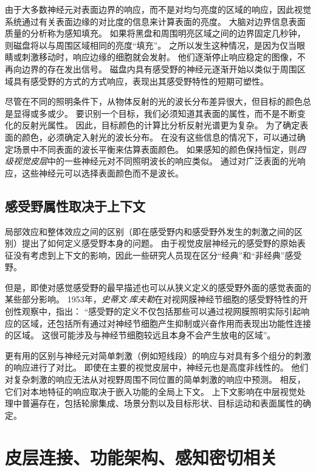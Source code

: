 由于大多数神经元对表面边界的响应，而不是对均匀亮度的区域的响应，因此视觉系统通过有关表面边缘的对比度的信息来计算表面的亮度。
大脑对边界信息表面质量的分析称为感知填充。
如果将黑盘和周围明亮区域之间的边界固定几秒钟，则磁盘将以与周围区域相同的亮度“填充”。
之所以发生这种情况，是因为仅当眼睛或刺激移动时，响应边缘的细胞就会发射。
他们逐渐停止响应稳定的图像，不再向边界的存在发出信号。
磁盘内具有感受野的神经元逐渐开始以类似于周围区域具有感受野的方式的方式响应，表现出其感受野特性的短期可塑性。


尽管在不同的照明条件下，从物体反射的光的波长分布差异很大，但目标的颜色总是显得或多或少。
要识别一个目标，我们必须知道其表面的属性，而不是不断变化的反射光属性。
因此，目标颜色的计算比分析反射光谱更为复杂。
为了确定表面的颜色，必须确定入射光的波长分布。
在没有这些信息的情况下，可以通过确定场景中不同表面的波长平衡来估算表面颜色。
如果感知的颜色保持恒定，则\textit{四级视觉皮层}中的一些神经元对不同照明波长的响应类似。
通过对广泛表面的光响应，这些神经元可以选择表面颜色而不是波长。



\subsection{感受野属性取决于上下文}

局部效应和整体效应之间的区别（即在感受野内和感受野外发生的刺激之间的区别）提出了如何定义感受野本身的问题。
由于视觉皮层神经元的感受野的原始表征没有考虑到上下文的影响，因此一些研究人员现在区分“经典”和“非经典”感受野。


但是，即使对感觉感受野的最早描述也可以从狭义定义的感受野外面的感觉表面的某些部分影响。
1953年，\textit{史蒂文$\cdot$库夫勒}在对视网膜神经节细胞的感受野特性的开创性观察中，指出：
“感受野的定义不仅包括那些可以通过视网膜照明实际引起响应的区域，还包括所有通过对神经节细胞产生抑制或兴奋作用而表现出功能性连接的区域。
这很可能涉及与神经节细胞较远且本身不会产生放电的区域”。


更有用的区别与神经元对简单刺激（例如短线段）的响应与对具有多个组分的刺激的响应进行了对比。
即使在主要的视觉皮层中，神经元也是高度非线性的。
他们对复杂刺激的响应无法从对视野周围不同位置的简单刺激的响应中预测。
相反，它们对本地特征的响应取决于嵌入功能的全局上下文。
上下文影响在中层视觉处理中普遍存在，包括轮廓集成、场景分割以及目标形状、目标运动和表面属性的确定。



\section{皮层连接、功能架构、感知密切相关}

